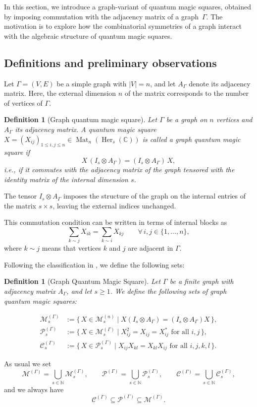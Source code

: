 \documentclass[11pt, a4paper]{article}
\theoremstyle{plain}
\newtheorem{definition}[theorem]{Definition}
\theoremstyle{definition}
\theoremstyle{remark}
\newcommand{\N}{\mathbb{N}}
\newcommand{\C}{\mathbb{C}}
\newcommand{\cMn}{\mathcal{M}^{(n)}}
\newcommand{\cMG}{\mathcal{M}^{(\Gamma)}}
\newcommand{\cPG}{\mathcal{P}^{(\Gamma)}}
\newcommand{\cCG}{\mathcal{C}^{(\Gamma)}}
\newcommand{\Her}[2][\C]{\operatorname{Her}_{#2}(#1)}
\newcommand{\Mat}[2]{\operatorname{Mat}_{#2}\!\left(#1\right)}
\begin{document}
In this section, we introduce a graph-variant of quantum magic squares, 
obtained by imposing commutation with the adjacency matrix of a graph~\(\Gamma\).
The motivation is to explore how the combinatorial symmetries of a graph
interact with the algebraic structure of quantum magic squares.

\subsection{Definitions and preliminary observations}

Let \(\Gamma = (V,E)\) be a simple graph with \(|V| = n\), and let \(A_\Gamma\) denote
its adjacency matrix. Here, the external dimension \(n\) of the matrix corresponds to 
the number of vertices of \(\Gamma\).

\begin{definition}[Graph quantum magic square]
Let \(\Gamma\) be a graph on \(n\) vertices and \(A_\Gamma\) its adjacency matrix.
A quantum magic square \(X = (X_{ij})_{1\le i,j\le n} \in \Mat{\Her s}{n}\)
is called a \emph{graph quantum magic square} if
\[
X\,(I_s \otimes A_\Gamma)
=
(I_s \otimes A_\Gamma)\,X,
\]
i.e., if it commutes with the adjacency matrix of the graph tensored with the identity matrix of the internal dimension \(s\).

\end{definition}
The tensor \(I_s \otimes A_\Gamma\) imposes the structure of the graph on the internal entries of the matrix \(s\times s\), leaving the external indices unchanged.

This commutation condition can be written in terms of internal blocks as
\[
\sum_{k \sim j} X_{ik}
=
\sum_{k \sim i} X_{kj}
\qquad \forall\, i,j \in \{1,\dots,n\},
\]
where \(k\sim j\) means that vertices \(k\) and \(j\) are adjacent in \(\Gamma\).

Following the classification in \cite{DDN20}, we define the following sets:
\begin{definition}[Graph Quantum Magic Square]\label{def:GQMS}
Let \(\Gamma\) be a finite graph with adjacency matrix \(A_\Gamma\), and let \(s\ge1\).
We define the following sets of graph quantum magic squares:
    
\[
\begin{aligned}
\cMG_s
&:= \{\,X \in \cMn_s \mid X (I_s \otimes A_\Gamma) = (I_s \otimes A_\Gamma) X \,\},\\
\cPG_s
&:= \{\,X \in \cMG_s \mid X_{ij}^2 = X_{ij} = X_{ij}^* \text{ for all } i,j \,\},\\
\cCG_s
&:= \{\,X \in \cPG_s \mid X_{ij}X_{kl} = X_{kl}X_{ij} \text{ for all } i,j,k,l \,\}.
\end{aligned}
\]
\end{definition}
As usual we set
\[
\cMG = \bigcup_{s\in\N} \cMG_s,
\qquad
\cPG = \bigcup_{s\in\N} \cPG_s,
\qquad
\cCG = \bigcup_{s\in\N} \cCG_s,
\]
and we always have
\[
\cCG \subseteq \cPG \subseteq \cMG.
\]
\end{document}
